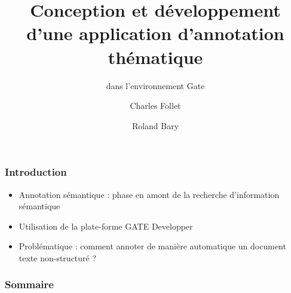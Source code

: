 \documentclass[10pt, compress]{beamer}
\title{Conception et développement d’une application d’annotation thématique}
\subtitle{dans l’environnement Gate}
\date{}
\author{Charles Follet \and Roland Bary}
\institute{Université de Pau et Pays de l'Adour}
\begin{document}
\maketitle
\begin{frame}[fragile]
	\frametitle{Introduction}
		\begin{itemize}[<+->]
  			[square]
  			\item{Annotation sémantique : phase en amont de la recherche d'information sémantique}
  			\item{Utilisation de la plate-forme GATE Developper}
  			\item{Problématique : comment annoter de manière automatique un document texte non-structuré ?}		
  		\end{itemize}
\end{frame}
\begin{frame}[fragile]
  \frametitle{Sommaire}
  \tableofcontents
\end{frame}
\end{document}
